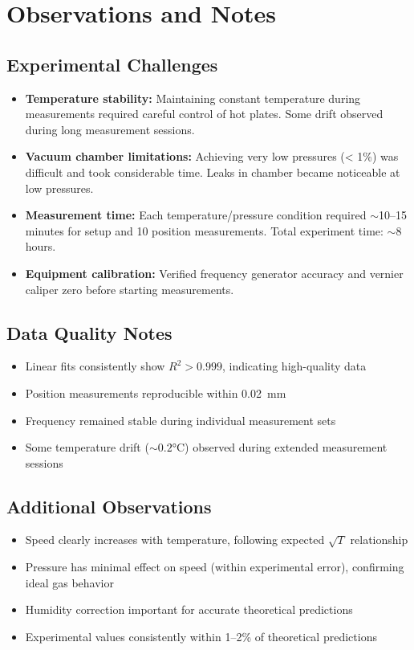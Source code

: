 \documentclass[12pt]{article}
\begin{document}
\section{Observations and Notes}

\subsection{Experimental Challenges}

\begin{itemize}
    \item \textbf{Temperature stability:} Maintaining constant temperature during measurements required careful control of hot plates. Some drift observed during long measurement sessions.
    \item \textbf{Vacuum chamber limitations:} Achieving very low pressures (< 1\%) was difficult and took considerable time. Leaks in chamber became noticeable at low pressures.
    \item \textbf{Measurement time:} Each temperature/pressure condition required $\sim$10--15 minutes for setup and 10 position measurements. Total experiment time: $\sim$8 hours.
    \item \textbf{Equipment calibration:} Verified frequency generator accuracy and vernier caliper zero before starting measurements.
\end{itemize}

\subsection{Data Quality Notes}

\begin{itemize}
    \item Linear fits consistently show $R^2 > 0.999$, indicating high-quality data
    \item Position measurements reproducible within \SI{0.02}{\milli\meter}
    \item Frequency remained stable during individual measurement sets
    \item Some temperature drift ($\sim 0.2$°C) observed during extended measurement sessions
\end{itemize}

\subsection{Additional Observations}

\begin{itemize}
    \item Speed clearly increases with temperature, following expected $\sqrt{T}$ relationship
    \item Pressure has minimal effect on speed (within experimental error), confirming ideal gas behavior
    \item Humidity correction important for accurate theoretical predictions
    \item Experimental values consistently within 1--2\% of theoretical predictions
\end{itemize}
\end{document}
